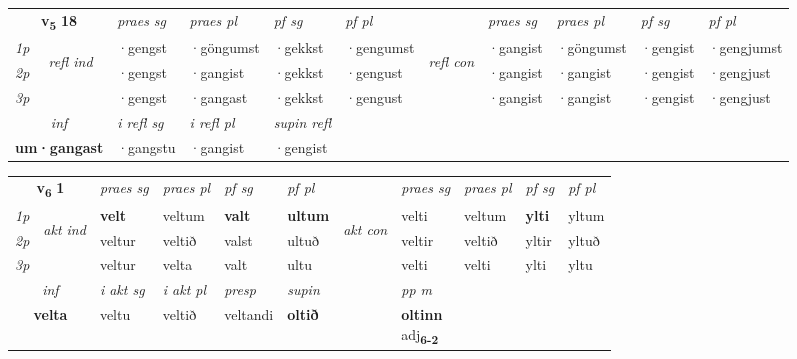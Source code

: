\noindent
\begin{tabular}{lllllllllll} \toprule
\multicolumn{2}{c}{\textbf{v{\textsubscript{5}}} \Large{\textbf{18}}}  &  \textit{praes sg}  & \textit{praes pl}  &\textit{ pf sg} & \textit{pf pl} &  &  \textit{praes sg}  & \textit{praes pl}  & \textit{pf sg} & \textit{pf pl } \\*
	\cmidrule{3-6} \cmidrule{8-11}
 {\textit{1p}} & \multirow{3}{*}{\begin{turn}{90}\textit{refl ind}\end{turn}}  & ·gengst & ·göngumst & ·gekkst & ·gengumst & \multirow{3}{*}{\begin{turn}{90}\textit{refl con}\end{turn}}  &·gangist & ·göngumst & ·gengist & ·gengjumst \\*
 {\textit{2p}} &  & ·gengst & ·gangist & ·gekkst & ·gengust & &·gangist & ·gangist & ·gengist & ·gengjust \\*
 {\textit{3p}}  & & ·gengst & ·gangast & ·gekkst & ·gengust & & ·gangist & ·gangist& ·gengist & ·gengjust \\*
\cmidrule{3-6} \cmidrule{8-11}

   \multicolumn{2}{c}{\textit{inf}}   & \textit{i refl sg} & \textit{i refl pl}   & \textit{supin refl}  \\*
  \multicolumn{2}{c}{\textbf{um\allowbreak ·gangast}}    & ·gangstu & ·gangist   & ·gengist  \\*
\end{tabular}

\noindent
\begin{tabular}{lllllllllll} \toprule
\multicolumn{2}{c}{\textbf{v{\textsubscript{6}}} \Large{\textbf{1}}}  &  \textit{praes sg}  & \textit{praes pl}  &\textit{ pf sg} & \textit{pf pl} &  &  \textit{praes sg}  & \textit{praes pl}  & \textit{pf sg} & \textit{pf pl } \\*
	\cmidrule{3-6} \cmidrule{8-11}
 {\textit{1p}} & \multirow{3}{*}{\begin{turn}{90}\textit{akt ind}\end{turn}} & \textbf{velt} & veltum & \textbf{valt} & \textbf{ultum} & \multirow{3}{*}{\begin{turn}{90}\textit{akt con}\end{turn}} &velti & veltum & \textbf{ylti} & yltum\\*
 {\textit{2p}} &  &  veltur  & veltið & valst & ultuð & & veltir & veltið & yltir & yltuð \\*
{\textit{3p}} &  & veltur & velta & valt & ultu & & velti & velti& ylti & yltu \\*
\cmidrule{3-6} \cmidrule{8-11}

   \multicolumn{2}{c}{\textit{inf}}  & \textit{i akt sg} & \textit{i akt pl}   & \textit{presp} & \textit{supin}  && \textit{pp m} \\*
  \multicolumn{2}{c}{\textbf{velta}} & veltu  & veltið   & veltandi &  \textbf{oltið}  && \specialcell{\textbf{oltinn} \\ adj\textbf{\textsubscript{6-2}}} \\*
\end{tabular}

